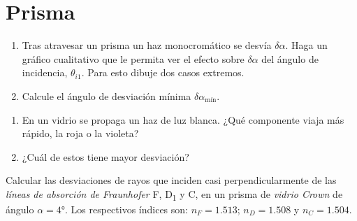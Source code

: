 \section*{Prisma}

\item
\begin{enumerate}
	\item 
	Tras atravesar un prisma un haz monocromático se desvía \(\delta \alpha\).
	Haga un gráfico cualitativo que le permita ver el efecto sobre \(\delta \alpha\) del ángulo de incidencia, \(\theta_{i1}\).
	Para esto dibuje dos casos extremos.
	\item Calcule el ángulo de desviación mínima \(\delta \alpha_\text{mín}\).
\end{enumerate}


\item
\begin{enumerate}
	\item En un vidrio se propaga un haz de luz blanca.
	¿Qué componente viaja más rápido, la roja o la violeta?
	\item ¿Cuál de estos tiene mayor desviación?
\end{enumerate}



\item 
Calcular las desviaciones de rayos que inciden casi perpendicularmente de las \emph{líneas de absorción de Fraunhofer} F, D\textsubscript{1} y C, en un prisma de \emph{vidrio Crown} de ángulo $\alpha = \ang{4;;}$.
Los respectivos índices son: $n_F = 1.513$; $n_D = 1.508$ y $n_C =1.504$.
